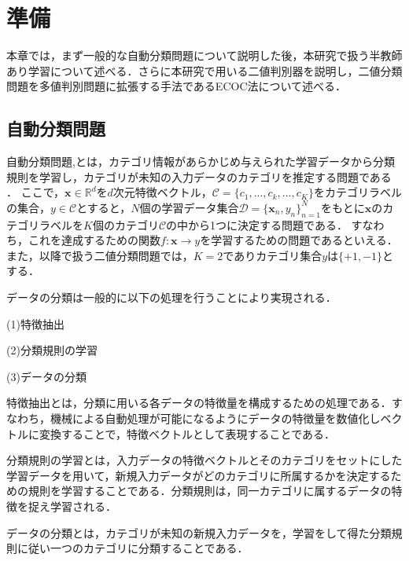 \chapter{準備}
本章では，まず一般的な自動分類問題について説明した後，本研究で扱う半教師あり学習について述べる．さらに本研究で用いる二値判別器を説明し，二値分類問題を多値判別問題に拡張する手法であるECOC法について述べる．

\section{自動分類問題}
自動分類問題\cite{bis1},\;\cite{bis2}とは，カテゴリ情報があらかじめ与えられた学習データから分類規則を学習し，カテゴリが未知の入力データのカテゴリを推定する問題である \cite{Nishida08}．
ここで，${\bm x} \in \mathbb{R}^{d}$を$d$次元特徴ベクトル，$\mathcal C = \{c_1,...,c_k,...,c_K\}$をカテゴリラベルの集合，$y\in \mathcal C$とすると，$N$個の学習データ集合$\mathcal D = \{{\bm x}_{n},y_{n}\}^{N}_{n=1}$をもとに${\bm x}$のカテゴリラベルを$K$個のカテゴリ$\mathcal C$の中から1つに決定する問題である．
すなわち，これを達成するための関数$f:{\bm x}→y$を学習するための問題であるといえる．また，以降で扱う二値分類問題では，$K = 2$でありカテゴリ集合$y$は$\{+1,-1\}$とする．

データの分類は一般的に以下の処理を行うことにより実現される．

(1)特徴抽出

(2)分類規則の学習

(3)データの分類

%

特徴抽出とは，分類に用いる各データの特徴量を構成するための処理である．すなわち，機械による自動処理が可能になるようにデータの特徴量を数値化しベクトルに変換することで，特徴ベクトルとして表現することである．

分類規則の学習とは，入力データの特徴ベクトルとそのカテゴリをセットにした学習データを用いて，新規入力データがどのカテゴリに所属するかを決定するための規則を学習することである．分類規則は，同一カテゴリに属するデータの特徴を捉え学習される．

データの分類とは，カテゴリが未知の新規入力データを，学習をして得た分類規則に従い一つのカテゴリに分類することである．
\par


